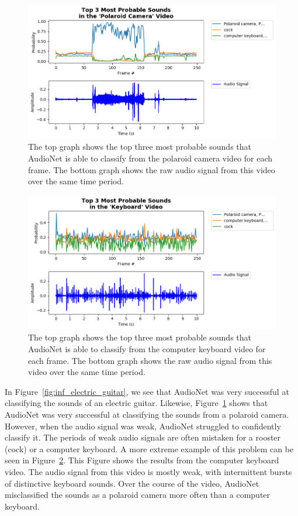 \documentclass[12pt,twoside]{article}
\theoremstyle{plain}
\theoremstyle{definition}
\theoremstyle{remark}
\begin{document}
\begin{figure}[H]
   \centerline{\includegraphics[width=\textwidth]{inf_polaroid_camera.png}}
   {\caption{\footnotesize The top graph shows the top three most probable sounds that AudioNet is able to classify from the polaroid camera video for each frame.
             The bottom graph shows the raw audio signal from this video over the same time period.}
     \label{fig:inf_polaroid_camera}}
\end{figure}

\begin{figure}[H]
   \centerline{\includegraphics[width=\textwidth]{inf_keyboard.png}}
   {\caption{\footnotesize The top graph shows the top three most probable sounds that AudioNet is able to classify from the computer keyboard video for each frame.
             The bottom graph shows the raw audio signal from this video over the same time period.}
     \label{fig:inf_keyboard}}
\end{figure}

In Figure~\ref{fig:inf_electric_guitar}, we see that AudioNet was very successful at classifying the sounds of an electric guitar.
Likewise, Figure~\ref{fig:inf_polaroid_camera} shows that AudioNet was very successful at classifying the sounds from a polaroid camera.
However, when the audio signal was weak, AudioNet struggled to confidently classify it.
The periods of weak audio signals are often mistaken for a rooster (cock) or a computer keyboard.
A more extreme example of this problem can be seen in Figure~\ref{fig:inf_keyboard}.
This Figure shows the results from the computer keyboard video.
The audio signal from this video is mostly weak, with intermittent bursts of distinctive keyboard sounds.
Over the course of the video, AudioNet misclassified the sounds as a polaroid camera more often than a computer keyboard.
\end{document}
